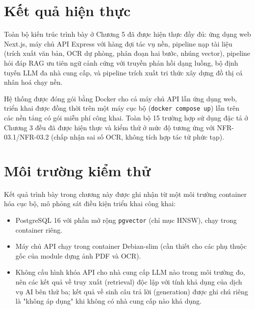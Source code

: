 \section{Kết quả hiện thực}
Toàn bộ kiến trúc trình bày ở Chương 5 đã được hiện thực đầy đủ: ứng dụng web Next.js, máy chủ API Express với hàng đợi tác vụ nền, pipeline nạp tài liệu (trích xuất văn bản, OCR dự phòng, phân đoạn hai bước, nhúng vector), pipeline hỏi đáp RAG ưu tiên ngữ cảnh cứng với truyền phản hồi dạng luồng, bộ định tuyến LLM đa nhà cung cấp, và pipeline trích xuất tri thức xây dựng đồ thị cá nhân hoá chạy nền.

Hệ thống được đóng gói bằng Docker cho cả máy chủ API lẫn ứng dụng web, triển khai được đồng thời trên một máy cục bộ (\texttt{docker compose up}) lẫn trên các nền tảng có gói miễn phí công khai. Toàn bộ 15 trường hợp sử dụng đặc tả ở Chương 3 đều đã được hiện thực và kiểm thử ở mức độ tương ứng với NFR-03.1/NFR-03.2 (chấp nhận sai số OCR, không tích hợp tác tử phức tạp).

\section{Môi trường kiểm thử}
Kết quả trình bày trong chương này được ghi nhận từ một môi trường container hóa cục bộ, mô phỏng sát điều kiện triển khai công khai:
\begin{itemize}
    \item PostgreSQL 16 với phần mở rộng \texttt{pgvector} (chỉ mục HNSW), chạy trong container riêng.
    \item Máy chủ API chạy trong container Debian-slim (cần thiết cho các phụ thuộc gốc của module dựng ảnh PDF và OCR).
    \item Không cấu hình khóa API cho nhà cung cấp LLM nào trong môi trường đo, nên các kết quả về truy xuất (retrieval) độc lập với tính khả dụng của dịch vụ AI bên thứ ba; kết quả về sinh câu trả lời (generation) được ghi chú riêng là "không áp dụng" khi không có nhà cung cấp nào khả dụng.
\end{itemize}
